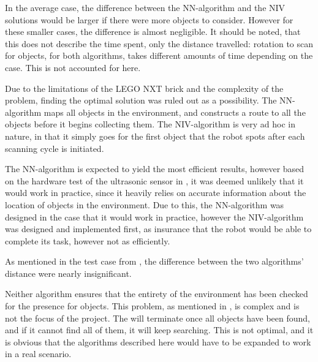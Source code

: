 In the average case, the difference between the NN-algorithm and the NIV solutions would be larger if there were more objects to consider. However for these smaller cases, the difference is almost negligible. It should be noted, that this does not describe the time spent, only the distance travelled: rotation to scan for objects, for both algorithms, takes different amounts of time depending on the case. This is not accounted for here.

Due to the limitations of the LEGO NXT brick and the complexity of the problem, finding the optimal solution was ruled out as a possibility. The NN-algorithm maps all objects in the environment, and constructs a route to all the objects before it begins collecting them. The NIV-algorithm is very ad hoc in nature, in that it simply goes for the first object that the robot spots after each scanning cycle is initiated. 

The NN-algorithm is expected to yield the most efficient results, however based on the hardware test of the ultrasonic sensor in , it was deemed unlikely that it would work in practice, since it heavily relies on accurate information about the location of objects in the environment. Due to this, the NN-algorithm was designed in the case that it would work in practice, however the NIV-algorithm was designed and implemented first, as insurance that the robot would be able to complete its task, however not as efficiently.

As mentioned in the test case from , the difference between the two algorithms' distance were nearly insignificant. 

Neither algorithm ensures that the entirety of the environment has been checked for the presence for objects. This problem, as mentioned in , is complex and is not the focus of the project. The \projname{} will terminate once all objects have been found, and if it cannot find all of them, it will keep searching. This is not optimal, and it is obvious that the algorithms described here would have to be expanded to work in a real scenario.